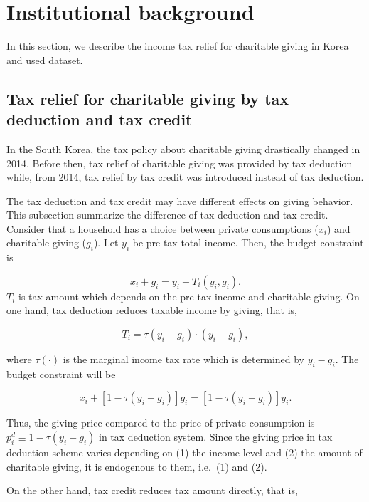 \documentclass[ review  , 3p ]{elsarticle}
\begin{document}
  \hypertarget{institutional-background}{%
  \section{Institutional background}\label{institutional-background}}
  
  In this section, we describe the income tax relief for charitable giving in Korea and used dataset.
  
  \hypertarget{tax-relief-for-charitable-giving-by-tax-deduction-and-tax-credit}{%
  \subsection{Tax relief for charitable giving by tax deduction and tax credit}\label{tax-relief-for-charitable-giving-by-tax-deduction-and-tax-credit}}
  
  In the South Korea, the tax policy about charitable giving drastically changed in 2014. Before then, tax relief of charitable giving was provided by tax deduction while, from 2014, tax relief by tax credit was introduced instead of tax deduction.
  
  The tax deduction and tax credit may have different effects on giving behavior. This subsection summarize the difference of tax deduction and tax credit.
  Consider that a household has a choice between private consumptions (\(x_i\)) and charitable giving (\(g_i\)). Let \(y_i\) be pre-tax total income.
  Then, the budget constraint is
  
  \[
      x_i + g_i = y_i - T_i(y_i, g_i).
  \]
  \(T_i\) is tax amount which depends on the pre-tax income and charitable giving.
  On one hand, tax deduction reduces taxable income by giving, that is,
  
  \[
      T_i = \tau(y_i - g_i) \cdot (y_i - g_i),
  \]
  
  where \(\tau(\cdot)\) is the marginal income tax rate which is determined by \(y_i - g_i\). The budget constraint will be
  
  \[
      x_i + [1 - \tau(y_i - g_i)]g_i = [1 - \tau(y_i - g_i)] y_i.
  \]
  
  Thus, the giving price compared to the price of private consumption is \(p_i^{d} \equiv 1 - \tau(y_i - g_i)\) in tax deduction system. Since the giving price in tax deduction scheme varies depending on (1) the income level and (2) the amount of charitable giving, it is endogenous to them, i.e.~(1) and (2).
  
  On the other hand, tax credit reduces tax amount directly, that is,
  
\end{document}
